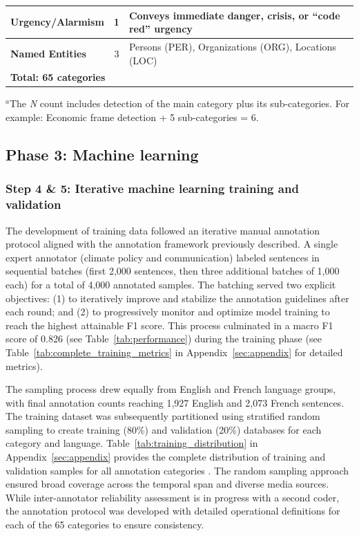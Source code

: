 \begin{table}[!ht]
\begin{tabularx}{\textwidth}{lcX}
\midrule
\cellcolor{gray!10}\textbf{Urgency/Alarmism} & \cellcolor{gray!10}1 & \cellcolor{gray!10}Conveys immediate danger, crisis, or ``code red'' urgency \\
\midrule
\cellcolor{gray!10}\textbf{Named Entities} & \cellcolor{gray!10}3 & \cellcolor{gray!10}Persons (PER), Organizations (ORG), Locations (LOC) \\
\midrule
\multicolumn{3}{l}{\cellcolor{gray!25}\textbf{Total: 65 categories}} \\
\bottomrule
\end{tabularx}
\vspace{-0.1em}
{\footnotesize $^a$The \emph{N} count includes detection of the main category plus its sub-categories. For example: Economic frame detection + 5 sub-categories = 6.}
\end{table}

\subsection{Phase 3: Machine learning}
\subsubsection{Step 4 \& 5: Iterative machine learning training and validation}

The development of training data followed an iterative manual annotation protocol aligned with the annotation framework previously described. A single expert annotator (climate policy and communication) labeled sentences in sequential batches (first 2,000 sentences, then three additional batches of 1,000 each) for a total of 4,000 annotated samples. The batching served two explicit objectives: (1) to iteratively improve and stabilize the annotation guidelines after each round; and (2) to progressively monitor and optimize model training to reach the highest attainable F1 score. This process culminated in a macro F1 score of 0.826 (see Table~\ref{tab:performance}) during the training phase (see Table~\ref{tab:complete_training_metrics} in Appendix~\ref{sec:appendix} for detailed metrics).

The sampling process drew equally from English and French language groups, with final annotation counts reaching 1,927 English and 2,073 French sentences. The training dataset was subsequently partitioned using stratified random sampling to create training (80\%) and validation (20\%) databases for each category and language. Table~\ref{tab:training_distribution} in Appendix~\ref{sec:appendix} provides the complete distribution of training and validation samples for all annotation categories \autocite{doAugmentedSocialScientist2022}. The random sampling approach ensured broad coverage across the temporal span and diverse media sources. While inter-annotator reliability assessment is in progress with a second coder, the annotation protocol was developed with detailed operational definitions for each of the 65 categories to ensure consistency.

